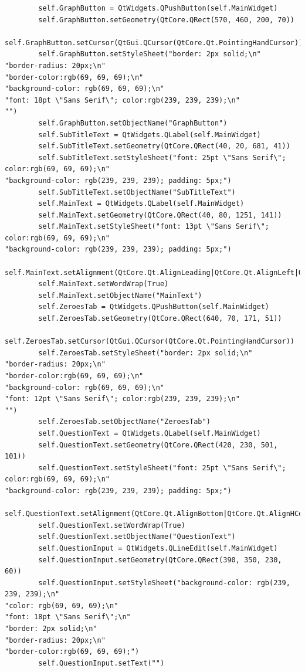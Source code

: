 \documentclass[12pt]{article}
\begin{document}
\begin{lstlisting}
        self.GraphButton = QtWidgets.QPushButton(self.MainWidget)
        self.GraphButton.setGeometry(QtCore.QRect(570, 460, 200, 70))
        self.GraphButton.setCursor(QtGui.QCursor(QtCore.Qt.PointingHandCursor))
        self.GraphButton.setStyleSheet("border: 2px solid;\n"
"border-radius: 20px;\n"
"border-color:rgb(69, 69, 69);\n"
"background-color: rgb(69, 69, 69);\n"
"font: 18pt \"Sans Serif\"; color:rgb(239, 239, 239);\n"
"")
        self.GraphButton.setObjectName("GraphButton")
        self.SubTitleText = QtWidgets.QLabel(self.MainWidget)
        self.SubTitleText.setGeometry(QtCore.QRect(40, 20, 681, 41))
        self.SubTitleText.setStyleSheet("font: 25pt \"Sans Serif\"; color:rgb(69, 69, 69);\n"
"background-color: rgb(239, 239, 239); padding: 5px;")
        self.SubTitleText.setObjectName("SubTitleText")
        self.MainText = QtWidgets.QLabel(self.MainWidget)
        self.MainText.setGeometry(QtCore.QRect(40, 80, 1251, 141))
        self.MainText.setStyleSheet("font: 13pt \"Sans Serif\"; color:rgb(69, 69, 69);\n"
"background-color: rgb(239, 239, 239); padding: 5px;")
        self.MainText.setAlignment(QtCore.Qt.AlignLeading|QtCore.Qt.AlignLeft|QtCore.Qt.AlignTop)
        self.MainText.setWordWrap(True)
        self.MainText.setObjectName("MainText")
        self.ZeroesTab = QtWidgets.QPushButton(self.MainWidget)
        self.ZeroesTab.setGeometry(QtCore.QRect(640, 70, 171, 51))
        self.ZeroesTab.setCursor(QtGui.QCursor(QtCore.Qt.PointingHandCursor))
        self.ZeroesTab.setStyleSheet("border: 2px solid;\n"
"border-radius: 20px;\n"
"border-color:rgb(69, 69, 69);\n"
"background-color: rgb(69, 69, 69);\n"
"font: 12pt \"Sans Serif\"; color:rgb(239, 239, 239);\n"
"")
        self.ZeroesTab.setObjectName("ZeroesTab")
        self.QuestionText = QtWidgets.QLabel(self.MainWidget)
        self.QuestionText.setGeometry(QtCore.QRect(420, 230, 501, 101))
        self.QuestionText.setStyleSheet("font: 25pt \"Sans Serif\"; color:rgb(69, 69, 69);\n"
"background-color: rgb(239, 239, 239); padding: 5px;")
        self.QuestionText.setAlignment(QtCore.Qt.AlignBottom|QtCore.Qt.AlignHCenter)
        self.QuestionText.setWordWrap(True)
        self.QuestionText.setObjectName("QuestionText")
        self.QuestionInput = QtWidgets.QLineEdit(self.MainWidget)
        self.QuestionInput.setGeometry(QtCore.QRect(390, 350, 230, 60))
        self.QuestionInput.setStyleSheet("background-color: rgb(239, 239, 239);\n"
"color: rgb(69, 69, 69);\n"
"font: 18pt \"Sans Serif\";\n"
"border: 2px solid;\n"
"border-radius: 20px;\n"
"border-color:rgb(69, 69, 69);")
        self.QuestionInput.setText("")

\end{lstlisting}
\end{document}
